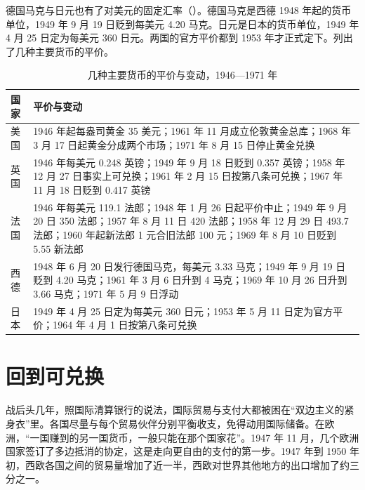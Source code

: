 德国马克与日元也有了对美元的固定汇率（）。德国马克是西德 1948 年起的货币单位，1949 年 9 月 19 日贬到每美元 4.20 马克\cite{bordo1993}。日元是日本的货币单位，1949 年 4 月 25 日定为每美元 360 日元\cite{bordo1993}。两国的官方平价都到 1953 年才正式定下\cite{bordo1993}。列出了几种主要货币的平价。

\begin{table}[tbp]
\centering\small
\caption{几种主要货币的平价与变动，1946—1971 年}\label{tab:brettonwoods-parities}
\begin{tabularx}{\linewidth}{@{}l X@{}}
\toprule
国家 & 平价与变动 \\
\midrule
美国 & 1946 年起每盎司黄金 35 美元；1961 年 11 月成立伦敦黄金总库；1968 年 3 月 17 日起黄金分成两个市场；1971 年 8 月 15 日停止黄金兑换 \\
英国 & 1946 年每美元 0.248 英镑；1949 年 9 月 18 日贬到 0.357 英镑；1958 年 12 月 27 日事实上可兑换；1961 年 2 月 15 日按第八条可兑换；1967 年 11 月 18 日贬到 0.417 英镑 \\
法国 & 1946 年每美元 119.1 法郎；1948 年 1 月 26 日起平价中止；1949 年 9 月 20 日 350 法郎；1957 年 8 月 11 日 420 法郎；1958 年 12 月 29 日 493.7 法郎；1960 年起新法郎 1 元合旧法郎 100 元；1969 年 8 月 10 日贬到 5.55 新法郎 \\
西德 & 1948 年 6 月 20 日发行德国马克，每美元 3.33 马克；1949 年 9 月 19 日贬到 4.20 马克；1961 年 3 月 6 日升到 4 马克；1969 年 10 月 26 日升到 3.66 马克；1971 年 5 月 9 日浮动 \\
日本 & 1949 年 4 月 25 日定为每美元 360 日元；1953 年 5 月 11 日定为官方平价；1964 年 4 月 1 日按第八条可兑换 \\
\bottomrule
\end{tabularx}
\end{table}

\section{回到可兑换}\label{sec:brettonwoods-convertibility}

战后头几年，照国际清算银行的说法，国际贸易与支付大都被困在“双边主义的紧身衣”里\cite{bis36}。各国尽量与每个贸易伙伴分别平衡收支，免得动用国际储备。在欧洲，“一国赚到的另一国货币，一般只能在那个国家花”\cite{bis36}。1947 年 11 月，几个欧洲国家签订了多边抵消的协定，这是走向更自由的支付的第一步\cite{bis36}。1947 年到 1950 年初，西欧各国之间的贸易量增加了近一半，西欧对世界其他地方的出口增加了约三分之一\cite{bis36}。

